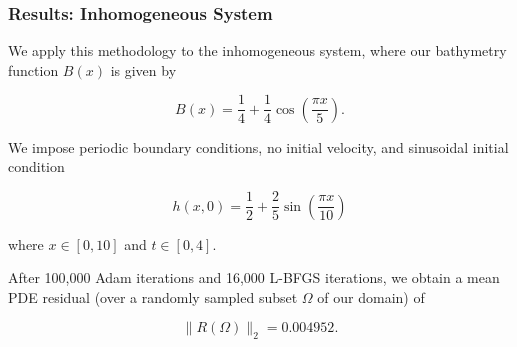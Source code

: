 \begin{frame}
    \frametitle{Results: Inhomogeneous System}

    We apply this methodology to the inhomogeneous system, where our bathymetry function 
    $B(x)$ is given by

    $$
    B(x) = \frac{1}{4} + \frac{1}{4} \cos{\left( \frac{\pi x}{5} \right)}.
    $$
   
    \pause
    We impose periodic boundary conditions, no initial velocity, and sinusoidal initial condition

    $$
    h(x, 0) = \frac{1}{2} + \frac{2}{5} \sin{\left( \frac{\pi x}{10} \right)}
    $$

    where $x \in [0, 10]$ and $t \in [0, 4]$.

    \medskip
    \pause

    After 100,000 Adam iterations and 16,000 L-BFGS iterations, we obtain a mean PDE residual (over a randomly sampled 
    subset $\Omega$ of our domain) of 
    
    $$
    \lVert R(\Omega) \rVert_2 = 0.004952.
    $$
\end{frame}